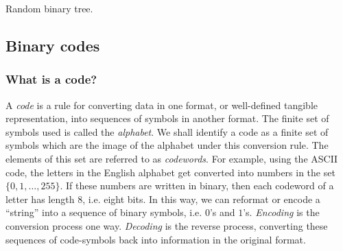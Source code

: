 \begin{algorithm}[!htbp]

\caption{Random binary tree.}
\label{alg:trees_forests:random_binary_tree}
\end{algorithm}



\subsection{Binary codes}



\subsubsection{What is a code?}

A \emph{code} is a rule for converting data in one format,
or well-defined tangible representation, into sequences of symbols in
another format. The finite set of symbols used is called the
\emph{alphabet}. We shall identify a code as a finite
set of symbols which are the image of the alphabet under this
conversion rule. The elements of this set are referred to as
\emph{codewords}. For example, using the
ASCII code, the letters in the
English alphabet get converted into numbers in
the set $\{0, 1, \dots, 255\}$. If these numbers are written in
binary, then each codeword of a letter has length $8$,
i.e. eight bits. In this way, we can reformat or encode a
``string'' into a sequence of binary
symbols, i.e. $0$'s and $1$'s. \emph{Encoding} is
the conversion process one way. \emph{Decoding} is the
reverse process, converting these sequences of code-symbols back into
information in the original format.

